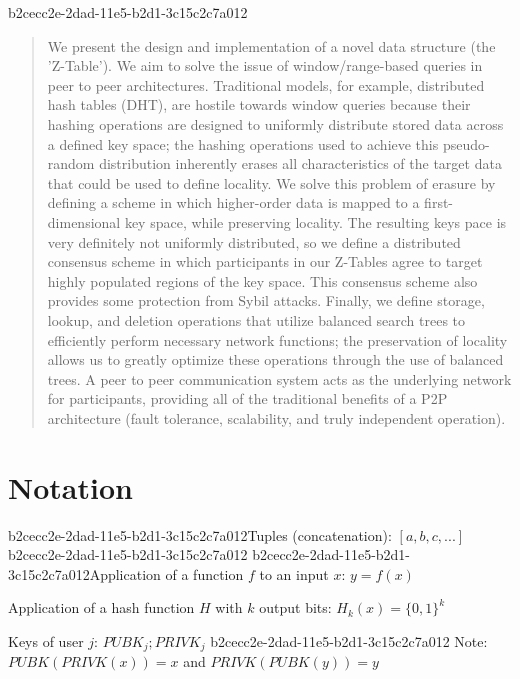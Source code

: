 \documentclass[12pt]{article}
\begin{document}
b2cecc2e-2dad-11e5-b2d1-3c15c2c7a012\maketitle

\begin{abstract}
We present the design and implementation of a novel data structure (the 'Z-Table'). We aim to solve the issue of window/range-based queries in peer to peer architectures. Traditional models, for example,  distributed hash tables (DHT), are hostile towards window queries because their hashing operations are designed to uniformly distribute stored data across a defined key space; the hashing operations used to achieve this pseudo-random distribution inherently erases all characteristics of the target data that could be used to define locality. We solve this problem of erasure by defining a scheme in which higher-order data is mapped to a first-dimensional key space, while preserving locality. The resulting keys pace is very definitely not uniformly distributed, so we define a distributed consensus scheme in which participants in our Z-Tables agree to target highly populated regions of the key space. This consensus scheme also provides some protection from Sybil attacks. Finally, we define storage, lookup, and deletion operations that utilize balanced search trees to efficiently perform necessary network functions; the preservation of locality allows us to greatly optimize these operations through the use of balanced trees. A peer to peer communication system acts as the underlying network for participants, providing all of the traditional benefits of a P2P architecture (fault tolerance, scalability, and truly independent operation).
\end{abstract}

\section{Notation}

b2cecc2e-2dad-11e5-b2d1-3c15c2c7a012Tuples (concatenation): $[a,b,c,...]$
b2cecc2e-2dad-11e5-b2d1-3c15c2c7a012
b2cecc2e-2dad-11e5-b2d1-3c15c2c7a012Application of a function $f$ to an input $x$: $y=f(x)$

Application of a hash function $H$ with $k$ output bits: $H_{k}(x) = \{0,1\}^k$

Keys of user $j$: $ PUBK_j; PRIVK_j $
b2cecc2e-2dad-11e5-b2d1-3c15c2c7a012
Note: $PUBK(PRIVK(x)) = x$ and $PRIVK(PUBK(y)) = y$~
\end{document}
